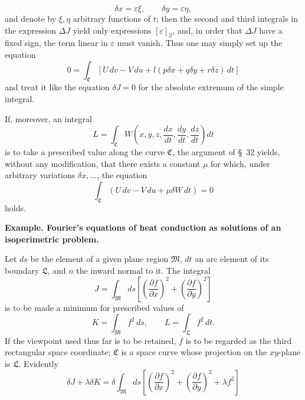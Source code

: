 \documentclass[11pt,a4paper,leqno]{article}
\begin{document}
\[
\delta x=\varepsilon\xi,\qquad \delta y=\varepsilon\eta,
\]
and denote by $\xi,\eta$ arbitrary functions of $t$; then the second and third
integrals in the expression $\Delta J$ yield only expressions
$[\varepsilon]_2$, and, in order that $\Delta J$ have a fixed sign, the term
linear in $\varepsilon$ must vanish. Thus one may simply set up the equation
\begin{equation}\tag{15}
0=\int_{\mathfrak{C}}
[U\,dv-V\,du+l(p\delta x+q\delta y+r\delta z)\,dt]
\end{equation}
and treat it like the equation $\delta J=0$ for the absolute extremum of the
simple integral.

If, moreover, an integral
\[
L=\int_{\mathfrak{C}}
W\left(x,y,z,\frac{dx}{dt},\frac{dy}{dt},\frac{dz}{dt}\right)dt
\]
is to take a prescribed value along the curve $\mathfrak{C}$, the argument of
\S~32 yields, without any modification, that there exists a constant $\mu$
for which, under arbitrary variations $\delta x,\ldots$, the equation
\[
\int_{\mathfrak{C}}(U\,dv-V\,du+\mu\delta W\,dt)=0
\]
holds.

\begin{center}
\textbf{Example. Fourier's equations of heat conduction as solutions of an
isoperimetric problem.}
\end{center}

Let $ds$ be the element of a given plane region $\mathfrak{M}$, $dt$ an arc
element of its boundary $\mathfrak{L}$, and $n$ the inward normal to it. The
integral
\[
J=\int_{\mathfrak{M}}ds
\left[\left(\frac{\partial f}{\partial x}\right)^2
+\left(\frac{\partial f}{\partial y}\right)^2\right]
\]
is to be made a minimum for prescribed values of
\[
K=\int_{\mathfrak{M}}f^2\,ds,\qquad
L=\int_{\mathfrak{L}}f^2\,dt.
\]
If the viewpoint used thus far is to be retained, $f$ is to be regarded as the
third rectangular space coordinate; $\mathfrak{C}$ is a space curve whose
projection on the $xy$-plane is $\mathfrak{L}$. Evidently
\[
\delta J+\lambda\delta K
=\delta\int_{\mathfrak{M}}ds
\left[\left(\frac{\partial f}{\partial x}\right)^2
+\left(\frac{\partial f}{\partial y}\right)^2+\lambda f^2\right]
\]
\end{document}
